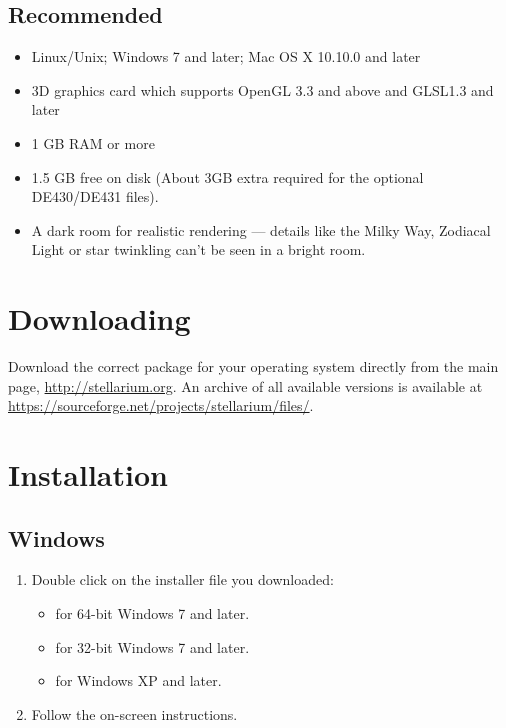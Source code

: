 \subsection{Recommended}
\begin{itemize}
\item Linux/Unix; Windows 7 and later; Mac OS X 10.10.0 and later
\item 3D graphics card which supports OpenGL 3.3 and above and GLSL1.3 and later
\item 1 GB RAM or more
\item 1.5 GB free on disk (About 3GB extra required for the optional DE430/DE431 files).
\item A dark room for realistic rendering --- details like the Milky Way, Zodiacal Light 
      or star twinkling can't be seen in a bright room.
\end{itemize}


\section{Downloading}
\label{sec:GettingStarted:Downloading}

Download the correct package for your operating system directly from the main page, \newline \url{http://stellarium.org}.
An archive of all available versions is available at \url{https://sourceforge.net/projects/stellarium/files/}.

\section{Installation}
\label{sec:GettingStarted:Installation}

\subsection{Windows}
\label{sec:GettingStarted:Installation:Windows}

\begin{enumerate}
\item Double click on the installer file you downloaded:
\begin{itemize}
\item {} for 64-bit Windows 7 and later.
\item {} for 32-bit Windows 7 and later.
\item {} for Windows XP and later.
\end{itemize}
\item Follow the on-screen instructions.
\end{enumerate}

